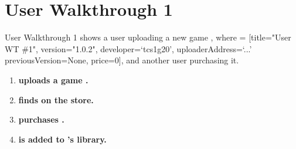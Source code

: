 
\section*{User Walkthrough 1}

User Walkthrough 1 shows a user  uploading a new game , where  = [title="User WT \#1", version="1.0.2", developer=`tcs1g20', uploaderAddress=`...' previousVersion=None, price=0], and another user  purchasing it. 

\begin{enumerate}
  \item \textbf{ uploads a game .}

  \item \textbf{ finds  on the store.}
  
  \item \textbf{ purchases .}
  
  \item \textbf{ is added to 's library.}
\end{enumerate}
